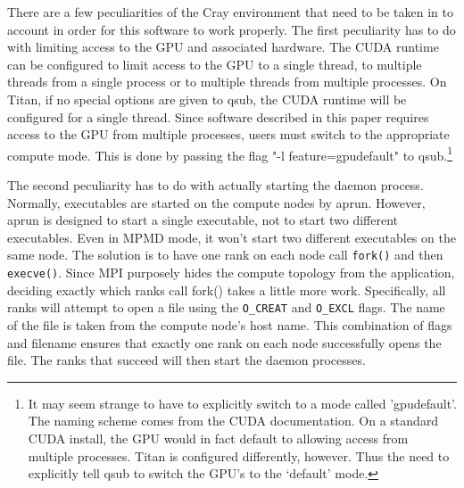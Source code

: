 There are a few peculiarities of the Cray environment that need to be taken in to account in order for this software to work properly.  The first peculiarity has to do with limiting access to the GPU and associated hardware.  The CUDA runtime can be configured to limit access to the GPU to a single thread, to multiple threads from a single process or to multiple threads from multiple processes.  On Titan, if no special options are given to qsub, the CUDA runtime will be configured for a single thread.  Since software described in this paper requires access to the GPU from multiple processes, users must switch to the appropriate compute mode.  This is done by passing the flag "-l feature=gpudefault" to qsub.\footnote{It may seem strange to have to explicitly switch to a mode called 'gpudefault'.  The naming scheme comes from the CUDA documentation.  On a standard CUDA install, the GPU would in fact default to allowing access from multiple processes.  Titan is configured differently, however.  Thus the need to explicitly tell qsub to switch the GPU's to the `default' mode.}

The second peculiarity has to do with actually starting the daemon process.  Normally, executables are started on the compute nodes by aprun.  However, aprun is designed to start a single executable, not to start two different executables.  Even in MPMD mode, it won't start two different executables on the same node.  The solution is to have one rank on each node call \texttt{fork()} and then \texttt{execve()}.  Since MPI purposely hides the compute topology from the application, deciding exactly which ranks call fork() takes a little more work.  Specifically, all ranks will attempt to open a file using the \texttt{O\_CREAT} and 
\texttt{O\_EXCL} flags.  The name of the file is taken from the compute node's host name.  This combination of flags and filename ensures that exactly one rank on each node successfully opens the file.  The ranks that succeed will then start the daemon processes.

%
%

